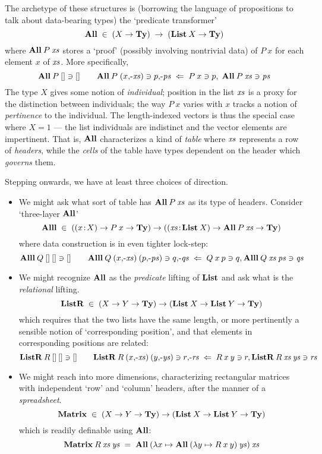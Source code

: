 \documentclass{article}
\begin{document}
The archetype of these structures is (borrowing the language of propositions to talk about data-bearing types) the `predicate transformer'
\[
\mathbf{All}\;\in\;(X\to\mathbf{Ty})\;\to\;(\mathbf{List}\:X\to\mathbf{Ty})
\]
where $\mathbf{All}\:P\:\mathit{xs}$ stores a `proof' (possibly involving nontrivial data) of $P\:x$ for each element $x$ of $\mathit{xs}$. More specifically,
\[
\mathbf{All}\:P\:[]\ni[] \qquad
\mathbf{All}\:P\;(x\mbox{$,\!\textrm{-}$}\mathit{xs})\ni p\mbox{$,\!\textrm{-}$}\mathit{ps} \;\Leftarrow\; P\:x\ni p,\; \mathbf{All}\:P\:\mathit{xs}\ni\mathit{ps}
\]
The type $X$ gives some notion of \emph{individual}; position in the list $\mathit{xs}$ is a proxy for the distinction between individuals; the way $P\:x$ varies with $x$ tracks a notion of \emph{pertinence} to the individual. The length-indexed vectors is thus the special case where $X = 1$ --- the list individuals are indistinct and the vector elements are impertinent. That is, $\mathbf{All}$ characterizes a kind of \emph{table} where $\mathit{xs}$ represents a row of \emph{headers}, while the \emph{cells} of the table have types dependent on the header which \emph{governs} them.

Stepping onwards, we have at least three choices of direction.
\begin{itemize}
\item We might ask what sort of table has $\mathbf{All}\:P\:\mathit{xs}$ as its type of headers. Consider `three-layer $\mathbf{All}$'
  \[
  \mathbf{Alll}\;\in\;((x\!:\! X)\to P\:x\to\mathbf{Ty})\to((\mathit{xs}\!:\!\mathbf{List}\:X)\to\mathbf{All}\:P\:\mathit{xs}\to\mathbf{Ty})
  \]
  where data construction is in even tighter lock-step:
  \[
  \mathbf{Alll}\:Q\:[]\:[]\ni[] \qquad
  \mathbf{Alll}\:Q\:(x\mbox{$,\!\textrm{-}$}\mathit{xs})\:(p\mbox{$,\!\textrm{-}$}\mathit{ps})\ni q\mbox{$,\!\textrm{-}$}\mathit{qs} \;\Leftarrow\;
    Q\:x\:p\ni q, \mathbf{Alll}\:Q\:\mathit{xs}\:\mathit{ps}\ni\mathit{qs}
    \]
\item We might recognize $\mathbf{All}$ as the \emph{predicate} lifting of $\mathbf{List}$ and ask what is the \emph{relational} lifting.
  \[
  \mathbf{ListR}\;\in\;(X\to Y\to\mathbf{Ty})\to(\mathbf{List}\:X \to \mathbf{List}\:Y \to\mathbf{Ty})
  \]
  which requires that the two lists have the same length, or more pertinently a sensible notion of `corresponding position', and that elements in corresponding positions are related:
  \[
  \mathbf{ListR}\:R\:[]\:[] \ni [] \qquad
  \mathbf{ListR}\:R\:(x\mbox{$,\!\textrm{-}$}\mathit{xs})\:(y\mbox{$,\!\textrm{-}$}\mathit{ys})\ni r\mbox{$,\!\textrm{-}$}\mathit{rs} \;\Leftarrow\;
  R\:x\:y\ni r, \mathbf{ListR}\:R\:\mathit{xs}\:\mathit{ys}\ni\mathit{rs}
  \]
\item We might reach into more dimensions, characterizing rectangular matrices with independent `row' and `column' headers, after the manner of a \emph{spreadsheet}.
  \[
  \mathbf{Matrix}\;\in\;(X\to Y\to\mathbf{Ty})\to(\mathbf{List}\:X \to \mathbf{List}\:Y \to\mathbf{Ty})
  \]
  which is readily definable using $\mathbf{All}$:
  \[
  \mathbf{Matrix}\:R\:\mathit{xs}\:\mathit{ys} \;=\; \mathbf{All}\:(\lambda x \mapsto \mathbf{All}\:(\lambda y\mapsto R\:x\:y)\:\mathit{ys})\:\mathit{xs}
  \]
\end{itemize}
\end{document}
